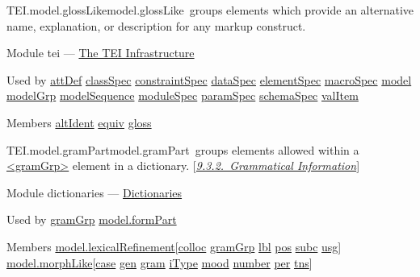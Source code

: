 \begin{reflist}
\item[]\begin{specHead}{TEI.model.glossLike}{model.glossLike} groups elements which provide an alternative name, explanation, or description for any markup construct.\end{specHead} 
    \item[{Module}]
  tei — \hyperref[ST]{The TEI Infrastructure}
    \item[{Used by}]
  \hyperref[TEI.attDef]{attDef} \hyperref[TEI.classSpec]{classSpec} \hyperref[TEI.constraintSpec]{constraintSpec} \hyperref[TEI.dataSpec]{dataSpec} \hyperref[TEI.elementSpec]{elementSpec} \hyperref[TEI.macroSpec]{macroSpec} \hyperref[TEI.model]{model} \hyperref[TEI.modelGrp]{modelGrp} \hyperref[TEI.modelSequence]{modelSequence} \hyperref[TEI.moduleSpec]{moduleSpec} \hyperref[TEI.paramSpec]{paramSpec} \hyperref[TEI.schemaSpec]{schemaSpec} \hyperref[TEI.valItem]{valItem}
    \item[{Members}]
  \hyperref[TEI.altIdent]{altIdent} \hyperref[TEI.equiv]{equiv} \hyperref[TEI.gloss]{gloss}
\end{reflist}  
\begin{reflist}
\item[]\begin{specHead}{TEI.model.gramPart}{model.gramPart} groups elements allowed within a \hyperref[TEI.gramGrp]{<gramGrp>} element in a dictionary. [\textit{\hyperref[DITPGR]{9.3.2.\ Grammatical Information}}]\end{specHead} 
    \item[{Module}]
  dictionaries — \hyperref[DI]{Dictionaries}
    \item[{Used by}]
  \hyperref[TEI.gramGrp]{gramGrp} \hyperref[TEI.model.formPart]{model.formPart}
    \item[{Members}]
  \hyperref[TEI.model.lexicalRefinement]{model.lexicalRefinement}[\hyperref[TEI.colloc]{colloc} \hyperref[TEI.gramGrp]{gramGrp} \hyperref[TEI.lbl]{lbl} \hyperref[TEI.pos]{pos} \hyperref[TEI.subc]{subc} \hyperref[TEI.usg]{usg}] \hyperref[TEI.model.morphLike]{model.morphLike}[\hyperref[TEI.case]{case} \hyperref[TEI.gen]{gen} \hyperref[TEI.gram]{gram} \hyperref[TEI.iType]{iType} \hyperref[TEI.mood]{mood} \hyperref[TEI.number]{number} \hyperref[TEI.per]{per} \hyperref[TEI.tns]{tns}]
\end{reflist}  
